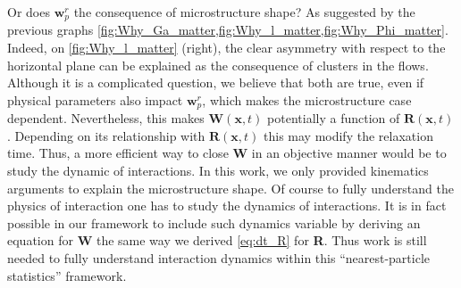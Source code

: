 Or does $\textbf{w}_p^r$ the consequence of microstructure shape? 
As suggested by the previous graphs \eqref{fig:Why_Ga_matter,fig:Why_l_matter,fig:Why_Phi_matter}. 
Indeed, on \ref{fig:Why_l_matter} (right), the clear asymmetry with respect to the horizontal plane can be explained as the consequence of clusters in the flows. 
Although it is a complicated question, we believe that both are true, even if physical parameters also impact $\textbf{w}_p^r$, which makes the microstructure case dependent.  
Nevertheless, this makes $\textbf{W}(\textbf{x},t)$ potentially a function of $\textbf{R}(\textbf{x},t)$.
Depending on its relationship with $\textbf{R}(\textbf{x},t)$ this may modify the relaxation time.  
Thus, a more efficient way to close \textbf{W} in an objective manner would be to study the dynamic of interactions. 
In this work, we only provided kinematics   arguments to explain the microstructure shape. 
Of course to fully understand the physics of interaction one has to study the dynamics of interactions. 
It is in fact possible in our framework to include such dynamics variable by deriving an equation for \textbf{W} the same way we derived \ref{eq:dt_R} for \textbf{R}.
Thus work is still needed to fully understand interaction dynamics within this ``nearest-particle statistics'' framework. 



